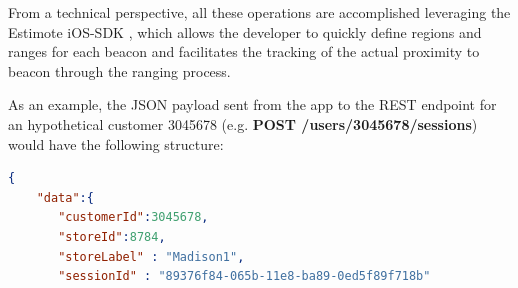 From a technical perspective, all these operations are accomplished leveraging the Estimote iOS-SDK \cite{estimote-ios-sdk}, which allows the developer to quickly define regions and ranges for each beacon and facilitates the tracking of the actual proximity to beacon through the ranging process.

As an example, the JSON payload sent from the app to the REST endpoint for an hypothetical customer 3045678 (e.g. \textbf{POST /users/3045678/sessions}) would have the following structure:


\vspace{0.5cm}
\begin{lstlisting}[language=json,firstnumber=1]
  {
    "data":{
       "customerId":3045678,
       "storeId":8784,
       "storeLabel" : "Madison1",
       "sessionId" : "89376f84-065b-11e8-ba89-0ed5f89f718b"


\end{lstlisting}

